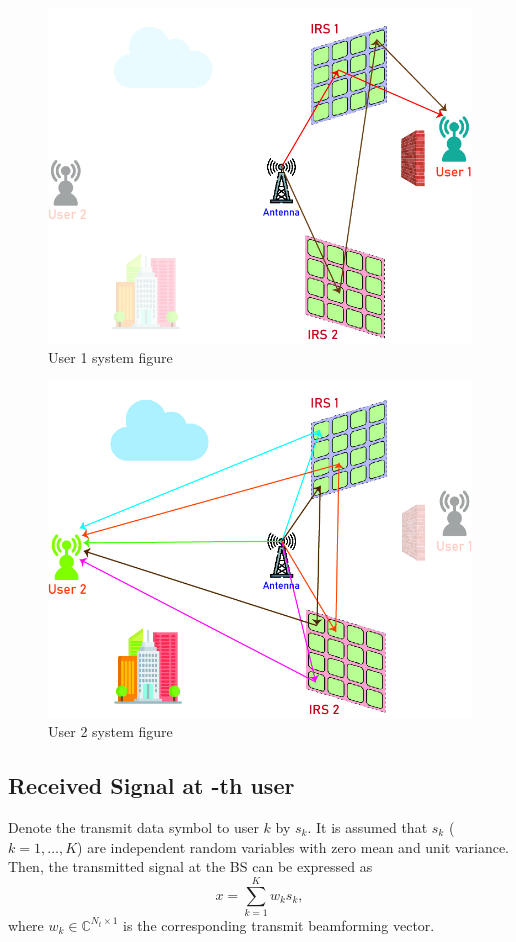 \documentclass[11pt,twocolumn,twoside]{opticajnl}
\begin{document}
\begin{figure}[!h]
	\centering
	\includegraphics[scale=0.2]{with_obstacle__user1}
	
	\caption[User 1 system figure]{
		User 1 system figure
	}
\end{figure}

\begin{figure}[!h]
	\centering
	\includegraphics[scale=0.2]{with_obstacle__user2}
	
	\caption[User 2 system figure]{
		User 2 system figure
	}
\end{figure}

\subsection{Received Signal at -th user}
Denote the transmit data symbol to user $k$ by $s_k$. It is assumed that $s_k$ ($k = 1, \ldots, K$) are independent random variables with zero mean and unit variance. Then, the transmitted signal at the BS can be expressed as
\begin{equation}
	x = \sum_{k=1}^{K} w_k s_k, \label{eq:transmitted_signal}
\end{equation}
where $w_k \in \mathbb{C}^{N_t \times 1}$ is the corresponding transmit beamforming vector.
\end{document}
